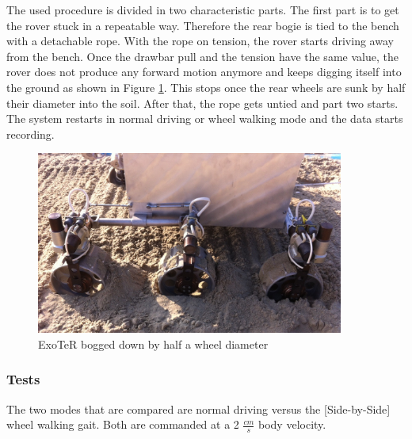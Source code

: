 \documentclass[a4paper,twocolumn]{esapub2005} %
\begin{document}
The used procedure is divided in two characteristic parts. The first part is to
get the rover stuck in a repeatable way. Therefore the rear bogie is tied to
the bench with a detachable rope. With the rope on tension, the rover starts
driving away from the bench. Once the drawbar pull and the tension have the
same value, the rover does not produce any forward motion anymore and keeps
digging itself into the ground as shown in Figure \ref{fig:volleyexoterdigg}.
This stops once the rear wheels are sunk by half their diameter into the soil.
After that, the rope gets untied and part two starts. The system restarts in
normal driving or wheel walking mode and the data starts recording. 

\begin{figure}[h!]
    \centering
    \includegraphics[width=0.9\textwidth]{volleyexoterdigg.jpg}
    \caption{ExoTeR bogged down by half a wheel diameter}
    \label{fig:volleyexoterdigg}
\end{figure}

\subsubsection{Tests} The two modes that are compared are normal driving versus
the [Side-by-Side] wheel walking gait. Both are commanded at a 2 $\frac{cm}{s}$
body velocity. 
\end{document}
